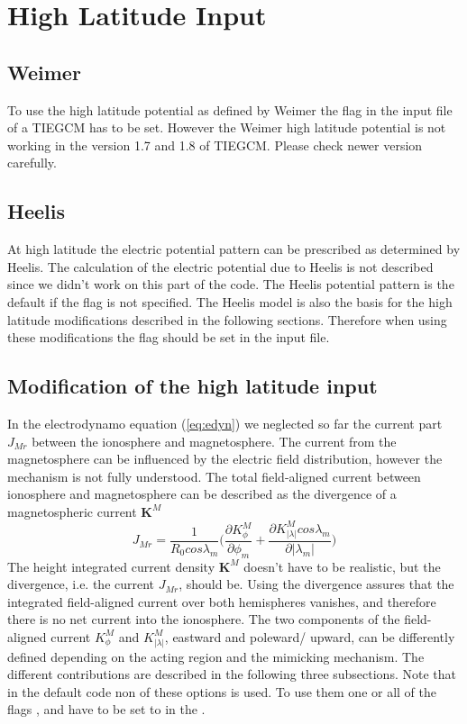 \section{High Latitude Input}\label{cap:high_lat}
%
\subsection{Weimer}
%
To use the high latitude potential as defined by
Weimer the flag  in the input file of a TIEGCM 
has to be set. However the Weimer high latitude
potential is not working in the version 1.7 and 1.8 of 
TIEGCM. Please check newer version carefully. 
%
\subsection{Heelis}
%
At high latitude the electric potential pattern can be prescribed as
determined by Heelis. The calculation of the
electric potential due to Heelis is not described since we didn't work
on this part of the code. The Heelis potential pattern is the
default if the flag  is not specified. 
The Heelis model is also the
basis for the high latitude modifications described in the following
sections. Therefore when using these modifications the flag  
 should be set in the input file. 
%
\subsection{Modification of the high latitude input}
%
In the electrodynamo equation (\ref{eq:edyn}) we neglected so far the
 current part $J_{Mr}$ between the ionosphere and magnetosphere. The current
from the magnetosphere can be influenced by the electric field
distribution, however the mechanism is not fully understood. The total field-aligned
current between ionosphere and magnetosphere can be described as the divergence
of a magnetospheric current $\mathbf{K}^M$
%
\begin{equation}
   {J}_{Mr}  = \frac{1}{R_0 cos \lambda_m} \bigl(
    \frac{\partial K_{\phi}^M}{\partial \phi_m} + 
    \frac{\partial K_{|\lambda|}^M cos \lambda_m}{\partial | \lambda_m| } \bigr) 
    \label{eq:magcurrent}
\end{equation}
%
The height integrated current density $\mathbf{K}^M$ doesn't have 
to be realistic, but the divergence, i.e. the current $J_{Mr}$,
should be. Using the divergence assures that the integrated field-aligned
current over both hemispheres vanishes, and therefore there is no net current into the
ionosphere. The two components of the field-aligned
current $K_{\phi}^M$ and $K_{|\lambda|}^M$, eastward and poleward/ upward, 
can be differently defined depending on the acting region and the
mimicking mechanism. The different contributions 
are described in the following three subsections. Note that in the
default code non of these options is used. To use them one or all
of the flags
,  and  have to be set to 
 in the  .
